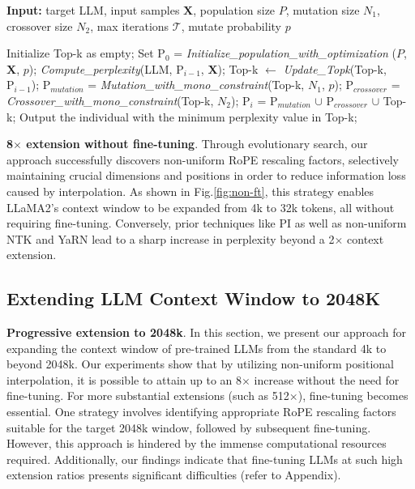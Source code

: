 \begin{algorithm}[t]
	\small
	\caption{The search algorithm}
	\textbf{Input:} target LLM, input samples $\mathbf{X}$, population size $P$, mutation size $N_1$, crossover size $N_2$, max iterations $\mathcal{T}$, mutate probability $p$\\

	\begin{algorithmic}[1]
		\label{alg:search}
		\STATE Initialize Top-k as empty;	
		\STATE Set $\text{P}_0$ = \textit{Initialize\_population\_with\_optimization} ($P$, $\mathbf{X}$, $p$); 
		\STATE \textit{Compute\_perplexity}(LLM, $\text{P}_{i-1}$, $\mathbf{X}$);
		\STATE  Top-k $\gets$ \textit{Update\_Topk}(Top-k, $\text{P}_{i-1}$);
		\STATE$\text{P}_{mutation}$ = \textit{Mutation\_with\_mono\_constraint}(Top-k, $N_1$, $p$); 
		\STATE $\text{P}_{crossover}$ = \textit{Crossover\_with\_mono\_constraint}(Top-k, $N_2$);
		\STATE $\text{P}_i$ = $\text{P}_{mutation}$ $\cup$ $\text{P}_{crossover}$ $\cup$ Top-k;
		\ENDFOR
		\STATE Output the individual with the minimum perplexity value in Top-k;
	\end{algorithmic}
\end{algorithm}

\textbf{8$\times$ extension without fine-tuning}. Through evolutionary search, our approach successfully discovers non-uniform RoPE rescaling factors, selectively maintaining crucial dimensions and positions in order to reduce information loss caused by interpolation. As shown in Fig.\ref{fig:non-ft}, this strategy enables LLaMA2's context window to be expanded from 4k to 32k tokens, all without requiring fine-tuning. Conversely, prior techniques like PI as well as non-uniform NTK and YaRN lead to a sharp increase in perplexity beyond a 2$\times$ context extension.

\subsection{Extending LLM Context Window to 2048K}
\label{sec:extendto2048k}

\textbf{Progressive extension to 2048k}. In this section, we present our approach for expanding the context window of pre-trained LLMs from the standard 4k to beyond 2048k. Our experiments show that by utilizing non-uniform positional interpolation, it is possible to attain up to an 8$\times$ increase without the need for fine-tuning. For more substantial extensions (such as 512$\times$), fine-tuning becomes essential. One strategy involves identifying appropriate RoPE rescaling factors suitable for the target 2048k window, followed by subsequent fine-tuning. However, this approach is hindered by the immense computational resources required. Additionally, our findings indicate that fine-tuning LLMs at such high extension ratios presents significant difficulties (refer to Appendix).

